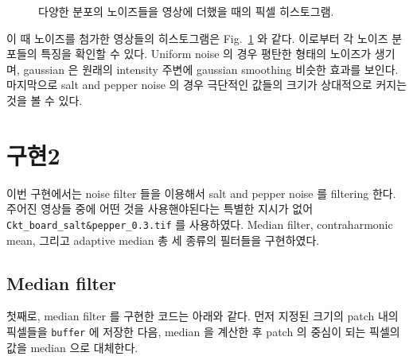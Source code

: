 \documentclass[a4paper, 12p]{paper}
\def\code#1{\texttt{#1}}
\begin{document}
\begin{figure}[H]
{}
\caption{다양한 분포의 노이즈들을 영상에 더했을 때의 픽셀 히스토그램.}\label{fig:hist}
\end{figure}

이 때 노이즈를 첨가한 영상들의 히스토그램은 Fig.~\ref{fig:hist} 와 같다. 이로부터 각 노이즈 분포들의 특징을 확인할 수 있다. Uniform noise 의 경우 평탄한 형태의 노이즈가 생기며, gaussian 은 원래의 intensity 주변에 gaussian smoothing 비슷한 효과를 보인다. 마지막으로 salt and pepper noise 의 경우 극단적인 값들의 크기가 상대적으로 커지는 것을 볼 수 있다.

\section{구현2}
이번 구현에서는 noise filter 들을 이용해서 salt and pepper noise 를 filtering 한다. 주어진 영상들 중에 어떤 것을 사용핸야된다는 특별한 지시가 없어 \code{Ckt\_board\_salt\&pepper\_0.3.tif} 를 사용하였다. Median filter, contraharmonic mean, 그리고 adaptive median 총 세 종류의 필터들을 구현하였다.

\subsection{Median filter}
첫째로, median filter 를 구현한 코드는 아래와 같다. 먼저 지정된 크기의 patch  내의 픽셀들을 \code{buffer} 에 저장한 다음, median 을 계산한 후 patch 의 중심이 되는 픽셀의 값을 median 으로 대체한다.
\end{document}

